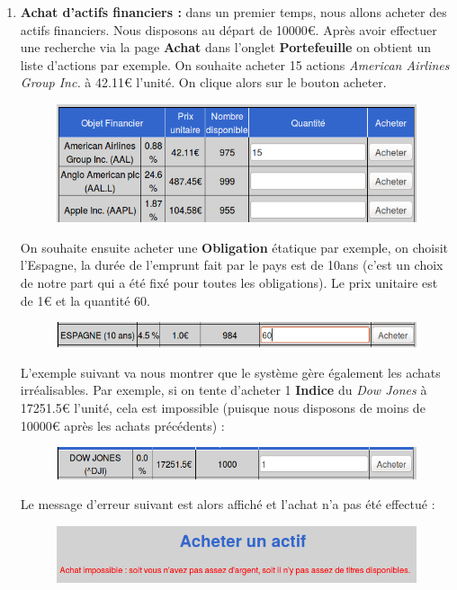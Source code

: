       \begin{enumerate}
       \item \textbf{Achat d'actifs financiers :} dans un premier temps, nous allons acheter des actifs financiers. Nous disposons au départ de 10000€. Après avoir effectuer une recherche via la page \textbf{Achat} dans l'onglet \textbf{Portefeuille} on obtient un liste d'actions par exemple. On souhaite acheter 15 actions \textit{American Airlines Group Inc.} à 42.11€ l'unité. On clique alors sur le bouton acheter.
      \begin{figure}[H]
	\center
	\includegraphics[scale=0.5]{../graph/7-achataction.png}
      \end{figure}

      On souhaite ensuite acheter une \textbf{Obligation} étatique par exemple, on choisit l'Espagne, la durée de l'emprunt fait par le pays est de 10ans (c'est un choix de notre part qui a été fixé pour toutes les obligations). Le prix unitaire est de 1€ et la quantité 60.
      \begin{figure}[H]
	\center
	\includegraphics[scale=0.5]{../graph/7-achatobligation.png}
      \end{figure}
      
      L'exemple suivant va nous montrer que le système gère également les achats irréalisables. Par exemple, si on tente d'acheter 1 \textbf{Indice} du \textit{Dow Jones} à 17251.5€ l'unité, cela est impossible (puisque nous disposons de moins de 10000€ après les achats précédents) :
      \begin{figure}[H]
	\center
	\includegraphics[scale=0.5]{../graph/7-achatindicetropcher.png}
      \end{figure}
      
      \newpage
      Le message d'erreur suivant est alors affiché et l'achat n'a pas été effectué :
      \begin{figure}[H]
	\center
	\includegraphics[scale=0.5]{../graph/7-achatindiceechec.png}
      \end{figure}
     

\end{enumerate}
